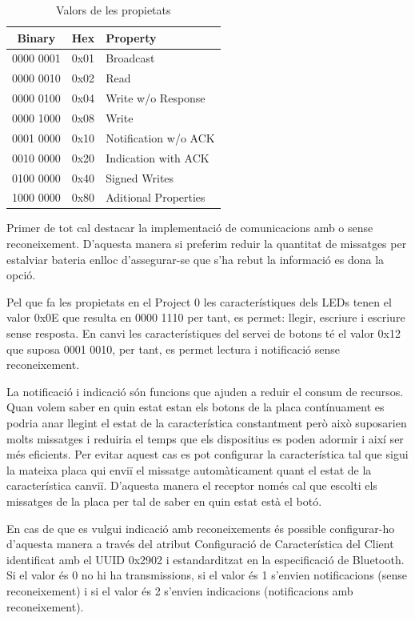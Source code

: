 \begin{table}
	\begin{center}
		\begin{tabular}{|c|c|l|}
			\hline
			Binary	&	Hex		&	Property	\\	\hline
			0000 0001	&	0x01	&	Broadcast\\	\hline
			0000 0010	&	0x02	&	Read	\\	\hline
			0000 0100	&	0x04	&	Write w/o Response	\\	\hline
			0000 1000	&	0x08	&	Write	\\	\hline
			0001 0000	&	0x10	&	Notification w/o ACK	\\	\hline
			0010 0000	&	0x20	&	Indication with ACK	\\	\hline
			0100 0000	&	0x40	&	Signed Writes	\\	\hline
			1000 0000	&	0x80	&	Aditional Properties	\\	\hline
		\end{tabular}
	\end{center}
\caption{Valors de les propietats}
\end{table}


Primer de tot cal destacar la implementació de comunicacions amb o sense reconeixement. D'aquesta manera si preferim reduir la quantitat de missatges per estalviar bateria enlloc d'assegurar-se que s'ha rebut la informació es dona la opció.

Pel que fa les propietats en el Project 0 les característiques dels LEDs tenen el valor 0x0E que resulta en 0000 1110 per tant, es permet: llegir, escriure i escriure sense resposta.
En canvi les característiques del servei de botons té el valor 0x12 que suposa 0001 0010, per tant, es permet lectura i notificació sense reconeixement.

La notificació i indicació són funcions que ajuden a reduir el consum de recursos.
Quan volem saber en quin estat estan els botons de la placa contínuament es podria anar llegint el estat de la característica constantment però això suposarien molts missatges i reduiria el temps que els dispositius es poden adormir i així ser més eficients.
Per evitar aquest cas es pot configurar la característica tal que sigui la mateixa placa qui enviï el missatge automàticament quant el estat de la característica canviï.
D'aquesta manera el receptor només cal que escolti els missatges de la placa per tal de saber en quin estat està el botó.

En cas de que es vulgui indicació amb reconeixements és possible configurar-ho d'aquesta manera a través del atribut Configuració de Característica del Client identificat amb el UUID 0x2902 i estandarditzat en la especificació de Bluetooth.
Si el valor és 0 no hi ha transmissions, si el valor és 1 s'envien notificacions (sense reconeixement) i si el valor és 2 s'envien indicacions (notificacions amb reconeixement). 

